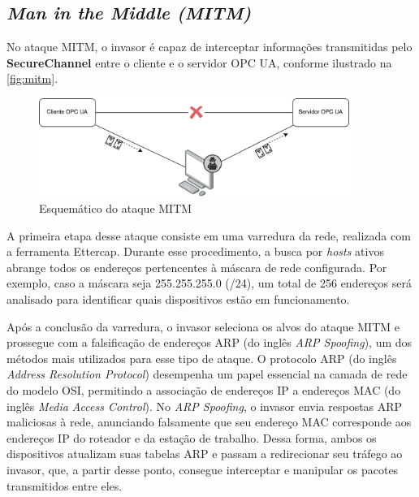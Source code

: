     \subsection{\textit{Man in the Middle (MITM)}}

       No ataque MITM, o invasor é capaz de interceptar informações transmitidas pelo \textbf{SecureChannel} entre o cliente e o servidor OPC UA, conforme ilustrado na \autoref{fig:mitm}.

        \begin{figure}[htbp]
            \caption{\label{fig:mitm}Esquemático do ataque MITM}
            \begin{center}
                \includegraphics[width=0.9\textwidth]{USPSC-img/mitm.png}
            \end{center}
        \end{figure}
        
        
        A primeira etapa desse ataque consiste em uma varredura da rede, realizada com a ferramenta Ettercap. Durante esse procedimento, a busca por \textit{hosts} ativos abrange todos os endereços pertencentes à máscara de rede configurada. Por exemplo, caso a máscara seja 255.255.255.0 (/24), um total de 256 endereços será analisado para identificar quais dispositivos estão em funcionamento.

        Após a conclusão da varredura, o invasor seleciona os alvos do ataque MITM e prossegue com a falsificação de endereços ARP (do inglês \textit{ARP Spoofing}), um dos métodos mais utilizados para esse tipo de ataque. O protocolo ARP (do inglês \textit{Address Resolution Protocol}) desempenha um papel essencial na camada de rede do modelo OSI, permitindo a associação de endereços IP a endereços MAC (do inglês \textit{Media Access Control}). No \textit{ARP Spoofing}, o invasor envia respostas ARP maliciosas à rede, anunciando falsamente que seu endereço MAC corresponde aos endereços IP do roteador e da estação de trabalho. Dessa forma, ambos os dispositivos atualizam suas tabelas ARP e passam a redirecionar seu tráfego ao invasor, que, a partir desse ponto, consegue interceptar e manipular os pacotes transmitidos entre eles.

